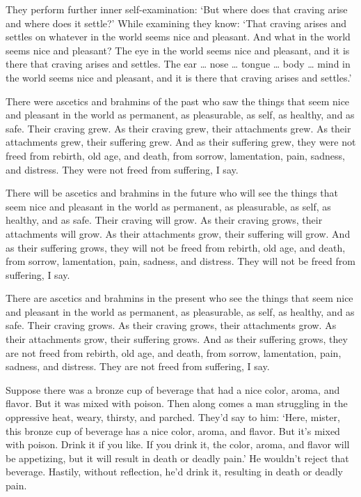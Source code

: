 \documentclass[12pt,openany]{book}%
\begin{document}
They perform further inner self-examination: ‘But where does that craving arise and where does it settle?’ While examining they know: ‘That craving arises and settles on whatever in the world seems nice and pleasant. And what in the world seems nice and pleasant? The eye in the world seems nice and pleasant, and it is there that craving arises and settles. The ear … nose … tongue … body … mind in the world seems nice and pleasant, and it is there that craving arises and settles.’ 

There were ascetics and brahmins of the past who saw the things that seem nice and pleasant in the world as permanent, as pleasurable, as self, as healthy, and as safe. Their craving grew. As their craving grew, their attachments grew. As their attachments grew, their suffering grew. And as their suffering grew, they were not freed from rebirth, old age, and death, from sorrow, lamentation, pain, sadness, and distress. They were not freed from suffering, I say. 

There will be ascetics and brahmins in the future who will see the things that seem nice and pleasant in the world as permanent, as pleasurable, as self, as healthy, and as safe. Their craving will grow. As their craving grows, their attachments will grow. As their attachments grow, their suffering will grow. And as their suffering grows, they will not be freed from rebirth, old age, and death, from sorrow, lamentation, pain, sadness, and distress. They will not be freed from suffering, I say. 

There are ascetics and brahmins in the present who see the things that seem nice and pleasant in the world as permanent, as pleasurable, as self, as healthy, and as safe. Their craving grows. As their craving grows, their attachments grow. As their attachments grow, their suffering grows. And as their suffering grows, they are not freed from rebirth, old age, and death, from sorrow, lamentation, pain, sadness, and distress. They are not freed from suffering, I say. 

Suppose there was a bronze cup of beverage that had a nice color, aroma, and flavor. But it was mixed with poison. Then along comes a man struggling in the oppressive heat, weary, thirsty, and parched. They’d say to him: ‘Here, mister, this bronze cup of beverage has a nice color, aroma, and flavor. But it’s mixed with poison. Drink it if you like. If you drink it, the color, aroma, and flavor will be appetizing, but it will result in death or deadly pain.’ He wouldn’t reject that beverage. Hastily, without reflection, he’d drink it, resulting in death or deadly pain. 
\end{document}
